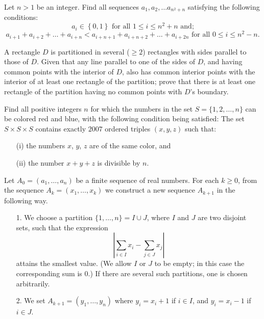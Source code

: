 \item[\textbf{C1.}]
Let 
$ n > 1$
 be an integer. Find all sequences 
$ a_1, a_2, \ldots a_{n^2 + n}$
 satisfying the following conditions:
\[a_i \in \left\{0,1\right\} \text{ for all } 1 \leq i \leq n^2 + n \text{ and;}
\]
\[ a_{i + 1} + a_{i + 2} + \ldots + a_{i + n} < a_{i + n + 1} + a_{i + n + 2} + \ldots + a_{i + 2n} \text{ for all } 0 \leq i \leq n^2 - n.
\]

\item[\textbf{C2.}]
A rectangle 
$ D$
 is partitioned in several 
($ \ge2$)
 rectangles with sides parallel to those of 
$ D$.
 Given that any line parallel to one of the sides of 
$ D$, 
 and having common points with the interior of 
$ D$, 
 also has common interior points with the interior of at least one rectangle of the partition; prove that there is at least one rectangle of the partition having no common points with 
$ D$'s boundary.

\item[\textbf{C3.}]
Find all positive integers 
$ n$
 for which the numbers in the set 
$ S = \{1,2, \ldots,n \}$
 can be colored red and blue, with the following condition being satisfied: The set 
$ S \times S \times S$
 contains exactly 
$ 2007$
 ordered triples 
$ \left(x, y, z\right)$
 such that:
 
\begin{itemize}

\item[(i)]
 the numbers 
$ x$, 
$ y$, 
$ z$
 are of the same color,
and

\item[(ii)]
 the number 
$ x + y + z$
 is divisible by 
$ n$.

\end{itemize}

\item[\textbf{C4.}]
Let 
$ A_0 = (a_1,\dots,a_n)$
 be a finite sequence of real numbers. For each 
$ k\geq 0$, 
 from the sequence 
$ A_k = (x_1,\dots,x_k)$
 we construct a new sequence 
$ A_{k + 1}$
 in the following way.

\begin{itemize}

\item[1.] We choose a partition 
$ \{1,\dots,n\} = I\cup J$, 
 where 
$ I$
 and 
$ J$
 are two disjoint sets, such that the expression
\[ \left|\sum_{i\in I}x_i - \sum_{j\in J}x_j\right|
\]
attains the smallest value. (We allow 
$ I$
 or 
$ J$
 to be empty; in this case the corresponding sum is 0.) If there are several such partitions, one is chosen arbitrarily.


\item[2.] We set 
$ A_{k + 1} = (y_1,\dots,y_n)$
 where 
$ y_i = x_i + 1$
 if 
$ i\in I$, 
 and 
$ y_i = x_i - 1$
 if 
$ i\in J$.

\end{itemize}

